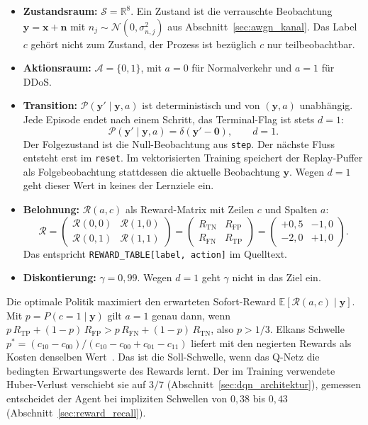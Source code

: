 \begin{itemize}
	\item \textbf{Zustandsraum:} $\mathcal{S}=\mathbb{R}^{8}$. Ein Zustand ist die verrauschte Beobachtung $\mathbf{y}=\mathbf{x}+\mathbf{n}$ mit $n_j\sim\mathcal{N}(0,\sigma_{n,j}^2)$ aus Abschnitt~\ref{sec:awgn_kanal}. Das Label $c$ gehört nicht zum Zustand, der Prozess ist bezüglich $c$ nur teilbeobachtbar.
	\item \textbf{Aktionsraum:} $\mathcal{A}=\{0,1\}$, mit $a=0$ für Normalverkehr und $a=1$ für DDoS.
	\item \textbf{Transition:} $\mathcal{P}(\mathbf{y}'\mid\mathbf{y},a)$ ist deterministisch und von $(\mathbf{y},a)$ unabhängig. Jede Episode endet nach einem Schritt, das Terminal-Flag ist stets $d=1$:
	\begin{equation}
		\mathcal{P}(\mathbf{y}'\mid\mathbf{y},a)=\delta(\mathbf{y}'-\mathbf{0}),\qquad d=1 .
	\end{equation}
	Der Folgezustand ist die Null-Beobachtung aus \texttt{step}. Der nächste Fluss entsteht erst im \texttt{reset}. Im vektorisierten Training speichert der Replay-Puffer als Folgebeobachtung stattdessen die aktuelle Beobachtung $\mathbf{y}$. Wegen $d=1$ geht dieser Wert in keines der Lernziele ein.
	\item \textbf{Belohnung:} $\mathcal{R}(a,c)$ als Reward-Matrix mit Zeilen $c$ und Spalten $a$:
	\begin{equation}
		\mathcal{R}=
		\begin{pmatrix}
			\mathcal{R}(0,0) & \mathcal{R}(1,0)\\
			\mathcal{R}(0,1) & \mathcal{R}(1,1)
		\end{pmatrix}
		=
		\begin{pmatrix}
			R_{\mathrm{TN}} & R_{\mathrm{FP}}\\
			R_{\mathrm{FN}} & R_{\mathrm{TP}}
		\end{pmatrix}
		=
		\begin{pmatrix}
			+0{,}5 & -1{,}0\\
			-2{,}0 & +1{,}0
		\end{pmatrix}.
	\end{equation}
	Das entspricht \texttt{REWARD\_TABLE[label, action]} im Quelltext.
	\item \textbf{Diskontierung:} $\gamma=0{,}99$. Wegen $d=1$ geht $\gamma$ nicht in das Ziel ein.
\end{itemize}

Die optimale Politik maximiert den erwarteten Sofort-Reward $\mathbb{E}[\mathcal{R}(a,c)\mid\mathbf{y}]$. Mit $p=P(c=1\mid\mathbf{y})$ gilt $a=1$ genau dann, wenn $p\,R_{\mathrm{TP}}+(1-p)\,R_{\mathrm{FP}}>p\,R_{\mathrm{FN}}+(1-p)\,R_{\mathrm{TN}}$, also $p>1/3$. Elkans Schwelle $p^*=(c_{10}-c_{00})/(c_{10}-c_{00}+c_{01}-c_{11})$ liefert mit den negierten Rewards als Kosten denselben Wert~\autocite{elkanFoundationsCostSensitiveLearning2001}. Das ist die Soll-Schwelle, wenn das Q-Netz die bedingten Erwartungswerte des Rewards lernt. Der im Training verwendete Huber-Verlust verschiebt sie auf $3/7$ (Abschnitt~\ref{sec:dqn_architektur}), gemessen entscheidet der Agent bei impliziten Schwellen von $0{,}38$ bis $0{,}43$ (Abschnitt~\ref{sec:reward_recall}).

